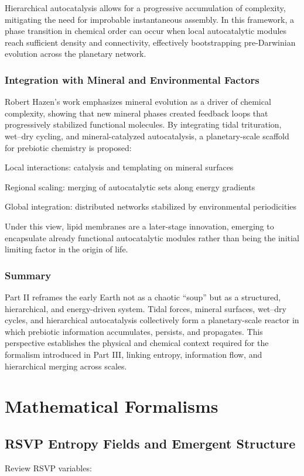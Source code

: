 \documentclass{book}
\begin{document}
Hierarchical autocatalysis allows for a progressive accumulation of complexity, mitigating the need for improbable instantaneous assembly. In this framework, a phase transition in chemical order can occur when local autocatalytic modules reach sufficient density and connectivity, effectively bootstrapping pre-Darwinian evolution across the planetary network.

\section{Integration with Mineral and Environmental Factors}
Robert Hazen’s work emphasizes mineral evolution as a driver of chemical complexity, showing that new mineral phases created feedback loops that progressively stabilized functional molecules. By integrating tidal trituration, wet–dry cycling, and mineral-catalyzed autocatalysis, a planetary-scale scaffold for prebiotic chemistry is proposed:

Local interactions: catalysis and templating on mineral surfaces

Regional scaling: merging of autocatalytic sets along energy gradients

Global integration: distributed networks stabilized by environmental periodicities

Under this view, lipid membranes are a later-stage innovation, emerging to encapsulate already functional autocatalytic modules rather than being the initial limiting factor in the origin of life.

\section{Summary}
Part II reframes the early Earth not as a chaotic “soup” but as a structured, hierarchical, and energy-driven system. Tidal forces, mineral surfaces, wet–dry cycles, and hierarchical autocatalysis collectively form a planetary-scale reactor in which prebiotic information accumulates, persists, and propagates. This perspective establishes the physical and chemical context required for the formalism introduced in Part III, linking entropy, information flow, and hierarchical merging across scales.

\part{Mathematical Formalisms}

\chapter{RSVP Entropy Fields and Emergent Structure}
Review RSVP variables:
\end{document}
